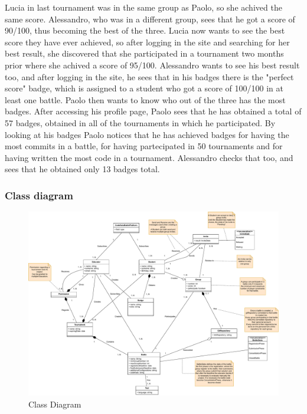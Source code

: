 \documentclass{article}
\begin{document}
{Lucia in last tournament was in the same group as Paolo, so she achived the same score. Alessandro, who was in a different group, sees that he got a score of 90/100, 
thus becoming the best of the three. Lucia now wants to see the best score they have ever achieved, so after logging in the site and searching for her best result, 
she discovered that she participated in a tournament two months prior where she achived a score of 95/100. 
Alessandro wants to see his best result too, and after logging in the site, he sees that in his badges there is the "perfect score" badge, 
which is assigned to a student who got a score of 100/100 in at least one battle.
Paolo then wants to know who out of the three has the most badges. 
After accessing his profile page, Paolo sees that he has obtained a total of 57 badges, obtained in all of the tournaments in which he participated. 
By looking at his badges Paolo notices that he has achieved badges for having the most commits in a battle, for having partecipated in 50 tournaments and 
for having written the most code in a tournament. 
Alessandro checks that too, and sees that he obtained only 13 badges total.

\subsubsection{Class diagram}
\begin{figure}[H]
    \centering
    \hspace*{-4.3cm}\includegraphics[scale=0.52]{images/ClassDiagram/ClassDiagram.pdf}
    \caption{Class Diagram}
    \label{fig:classDiagram}
\end{figure}

}
\end{document}
